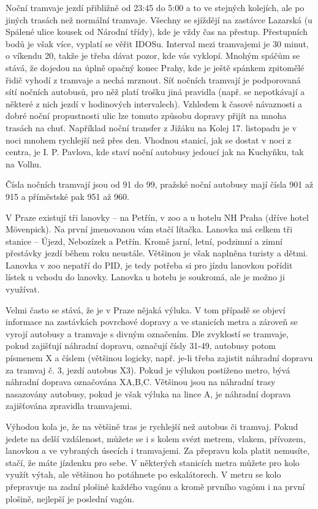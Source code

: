 Noční tramvaje jezdí přibližně od 23:45 do 5:00 a to ve stejných kolejích, ale
po jiných trasách než normální tramvaje. Všechny se sjíždějí na zastávce
Lazarská (u Spálené ulice kousek od Národní třídy), kde je vždy čas na přestup.
Přestupních bodů je však více, vyplatí se věřit IDOSu. Interval mezi tramvajemi
je 30 minut, o víkendu 20, takže je třeba dávat pozor, kde vás vyklopí. Mnohým
spáčům se stává, že dojedou na úplně opačný konec Prahy, kde je ještě spánkem
zpitomělé řidič vyhodí z tramvaje a nechá mrznout. Síť nočních tramvají je
podporovaná sítí nočních autobusů, pro něž platí trošku jiná pravidla (např. se
nepotkávají a některé z nich jezdí v hodinových intervalech). Vzhledem k časové
návaznosti a dobré noční propustnosti ulic lze tomuto způsobu dopravy přijít na
mnoha trasách na chuť. Například noční transfer z Jižáku na Kolej 17. listopadu
je v noci mnohem rychlejší než přes den. Vhodnou stanicí, jak se dostat v noci z
centra, je I. P. Pavlova, kde staví noční autobusy jedoucí jak na Kuchyňku, tak
na Volhu.

Čísla nočních tramvají jsou od 91 do 99, pražské noční autobusy mají čísla 901
až 915 a příměstské pak 951 až 960.

V Praze existují tři lanovky – na Petřín, v zoo a u hotelu NH Praha (dříve hotel
Mövenpick). Na první jmenovanou vám stačí lítačka. Lanovka má celkem tři stanice
– Újezd, Nebozízek a Petřín. Kromě jarní, letní, podzimní a zimní přestávky
jezdí během roku neustále. Většinou je však naplněna turisty a dětmi. Lanovka v
zoo nepatří do PID, je tedy potřeba si pro jízdu lanovkou pořídit lístek u
vchodu do lanovky. Lanovka u hotelu je soukromá, ale je možno ji využívat.

Velmi často se stává, že je v Praze nějaká výluka. V tom případě se objeví
informace na zastávkách povrchové dopravy a ve stanicích metra a zároveň se
vyrojí autobusy a tramvaje s divným označením. Dle zvyklostí se tramvaje, pokud
zajišťují náhradní dopravu, označují čísly 31-49, autobusy potom písmenem X a
číslem (většinou logicky, např. je-li třeba zajistit náhradní dopravu za tramvaj
č. 3, jezdí autobus X3). Pokud je výlukou postiženo metro, bývá náhradní doprava
označována X{A,B,C}. Většinou jsou na náhradní trasy nasazovány autobusy, pokud
je však výluka na lince A, je náhradní doprava zajišťována zpravidla tramvajemi.

Výhodou kola je, že na většině tras je rychlejší než autobus či tramvaj. Pokud
jedete na delší vzdálenost, můžete se i s kolem svézt metrem, vlakem, přívozem,
lanovkou a ve vybraných úsecích i tramvajemi. Za přepravu kola platit nemusíte,
stačí, že máte jízdenku pro sebe. V některých stanicích metra můžete pro kolo
využít výtah, ale většinou ho potáhnete po eskalátorech. V metru se kolo
přepravuje na zadní plošině každého vagónu a kromě prvního vagónu i na první
plošině, nejlepší je poslední vagón.

